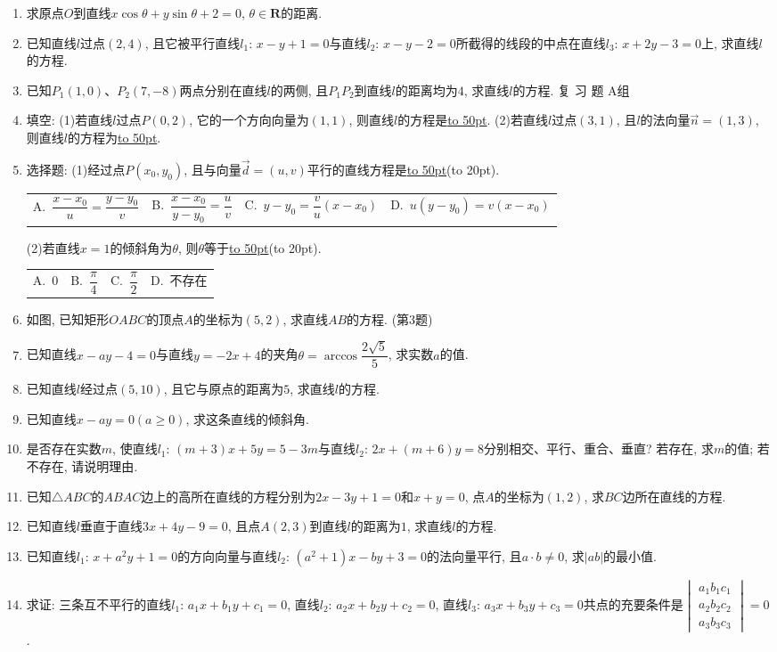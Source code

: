 \documentclass[10pt,a4paper]{article}
\newcommand{\blank}[1]{\underline{\hbox to #1pt{}}}
\newcommand{\bracket}[1]{(\hbox to #1pt{})}
\newcommand{\fourch}[4]{\par\begin{tabular}{p{.23\textwidth}p{.23\textwidth}p{.23\textwidth}p{.23\textwidth}}
A.~#1 &B.~#2& C.~#3& D.~#4
\end{tabular}}
\begin{document}
\begin{enumerate}[1.]
\item 求原点$O$到直线$x\cos \theta +y\sin \theta +2=0$, $\theta \in \mathbf{R}$的距离.
\item 已知直线$l$过点$(2,4)$, 且它被平行直线$l_1$: $x-y+1=0$与直线$l_2$: $x-y-2=0$所截得的线段的中点在直线$l_3$: $x+2y-3=0$上, 求直线$l$的方程.
\item 已知$P_1(1,0)$、$P_{2}(7,-8)$两点分别在直线$l$的两侧, 且$P_1P_2$到直线$l$的距离均为$4$, 求直线$l$的方程.
复 习 题
A组
\item 填空:
(1)若直线$l$过点$P(0,2)$, 它的一个方向向量为$(1,1)$, 则直线$l$的方程是\blank{50}.
(2)若直线$l$过点$(3,1)$, 且$l$的法向量$\overrightarrow n=(1,3)$, 则直线$l$的方程为\blank{50}.
\item 选择题:
(1)经过点$P(x_0,y_0)$, 且与向量$\overrightarrow d=(u,v)$平行的直线方程是\blank{50}\bracket{20}.
\fourch{$\dfrac{x-x_0}u=\dfrac{y-y_0}v$}{$\dfrac{x-{x_0}}{y-{y_0}}=\dfrac uv$}{$y-y_0=\dfrac vu(x-x_0)$}{$u(y-y_0)=v(x-x_0)$}
(2)若直线$x=1$的倾斜角为$\theta$, 则$\theta$等于\blank{50}\bracket{20}.
\fourch{$0$}{$\dfrac{\pi }4$}{$\dfrac{\pi }2$}{不存在}
\item 如图, 已知矩形$OABC$的顶点$A$的坐标为$(5,2)$, 求直线$AB$的方程.
(第3题)
\item 已知直线$x-ay-4=0$与直线$y=-2x+4$的夹角$\theta =\arccos \dfrac{2\sqrt 5}5$, 求实数$a$的值.
\item 已知直线$l$经过点$(5,10)$, 且它与原点的距离为$5$, 求直线$l$的方程.
\item 已知直线$x-ay=0(a\ge 0)$, 求这条直线的倾斜角.
\item 是否存在实数$m$, 使直线$l_1$: $(m+3)x+5y=5-3m$与直线$l_2$: $2x+(m+6)y=8$分别相交、平行、重合、垂直? 若存在, 求$m$的值; 若不存在, 请说明理由.
\item 已知$\triangle ABC$的$ABAC$边上的高所在直线的方程分别为$2x-3y+1=0$和$x+y=0$, 点$A$的坐标为$(1,2)$, 求$BC$边所在直线的方程.
\item 已知直线$l$垂直于直线$3x+4y-9=0$, 且点$A(2,3)$到直线$l$的距离为$1$, 求直线$l$的方程.
\item 已知直线$l_1$: $x+a^2y+1=0$的方向向量与直线$l_2$: $(a^2+1)x-by+3=0$的法向量平行, 且$a\cdot b\ne 0$, 求$|ab|$的最小值.
\item 求证: 三条互不平行的直线$l_1$: $a_1x+b_1y+c_1=0$, 直线$l_2$: $a_2x+b_2y+c_2=0$, 直线$l_3$: $a_3x+b_3y+c_{3}=0$共点的充要条件是$\begin{vmatrix}
    a_1  b_1  c_1  \\a_2  b_2  c_2  \\a_3  b_3  c_3  \end{vmatrix}=0$.

\end{enumerate}
\end{document}
